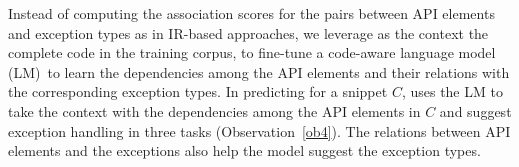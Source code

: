 Instead of computing the association scores for the pairs between API
elements and exception types as in IR-based approaches, we leverage as
the context the complete code in the training corpus, to fine-tune a code-aware
language model (LM)~to learn the dependencies among the API elements and their
relations with the corresponding exception types.
%
In predicting for a snippet $C$, {\tool} uses the LM to take the
context with the dependencies among the API elements in $C$ and suggest
exception handling in three tasks (Observation~\ref{ob4}). The
relations between API elements and the exceptions also help the model
suggest the exception types.




